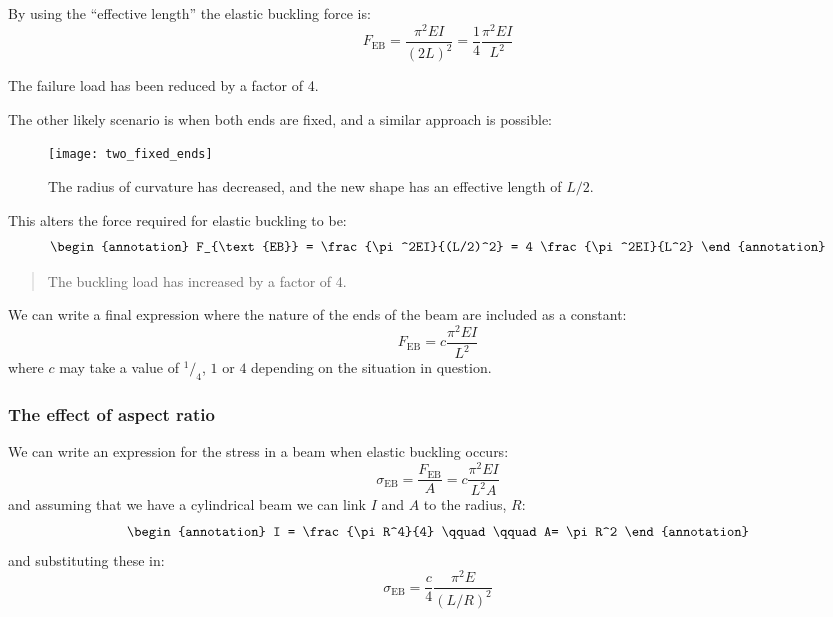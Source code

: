 By using the ``effective length'' the elastic buckling force is:
\begin{equation}
F_{\text{EB}} = \frac{\pi^2EI}{(2L)^2} = \frac{1}{4}\frac{\pi^2EI}{L^2}
\end{equation}
\begin{annotation}
The failure load has been reduced by a factor of 4.
\end{annotation}

The other likely scenario is when both ends are fixed, and a similar approach is possible:
\FloatBarrier
\begin{figure}[h!]
\centering
\texttt{[image: two\_fixed\_ends]}
\caption{The radius of curvature has decreased, and the new shape has an effective length of $L/2$.}
\end{figure}
\FloatBarrier

This alters the force required for elastic buckling to be:
\begin{equation}
\begin{annotation}
F_{\text{EB}} = \frac{\pi^2EI}{(L/2)^2} = 4 \frac{\pi^2EI}{L^2}
\end{annotation}
\end{equation}

\begin{quotation}
The buckling load has increased by a factor of 4.
\end{quotation}


We can write a final expression where the nature of the ends of the beam are included as a constant:
\begin{equation}
F_{\text{EB}} = c \frac{\pi^2 EI}{L^2}
\end{equation}
where $c$ may take a value of $^1\!/_4$, $1$ or $4$ depending on the situation in question.


\subsubsection{The effect of aspect ratio}

We can write an expression for the stress in a beam when elastic buckling occurs:
\begin{equation}
\sigma_{\text{EB}} = \frac{F_{\text{EB}}}{A} = c \frac{\pi^2 E I }{L^2 A}
\end{equation}
and assuming that we have a cylindrical beam we can link $I$ and $A$ to the radius, $R$:
\begin{equation}
\begin{annotation}
I = \frac{\pi R^4}{4} \qquad \qquad A= \pi R^2
\end{annotation}
\end{equation}
and substituting these in:
\begin{equation}
\sigma_{\text{EB}} = \frac{c}{4} \frac{\pi^2 E}{(L/R)^2}
\end{equation}

